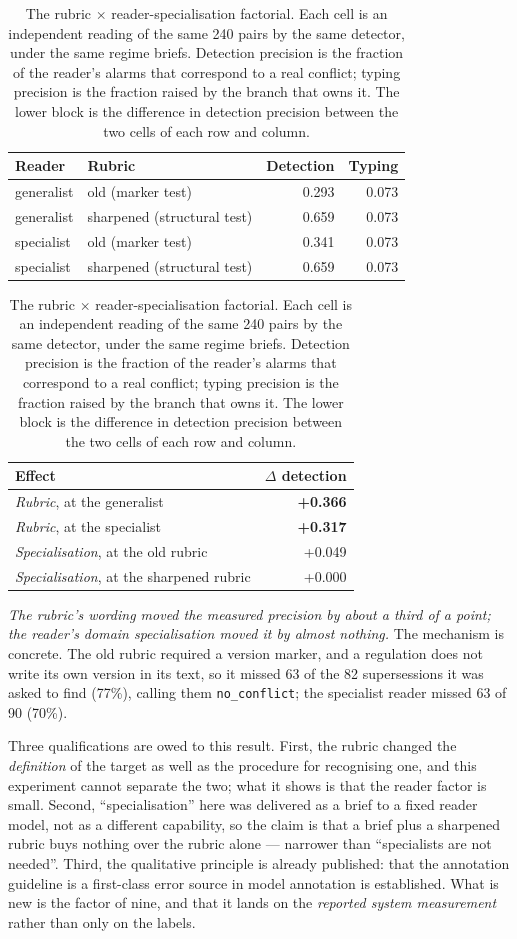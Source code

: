 \documentclass[preprint,3p,times]{elsarticle}
\begin{document}
\begin{table}[t]
\centering
\caption{The rubric $\times$ reader-specialisation factorial. Each cell is an independent reading of the same 240 pairs by the same detector, under the same regime briefs. Detection precision is the fraction of the reader's alarms that correspond to a real conflict; typing precision is the fraction raised by the branch that owns it. The lower block is the difference in detection precision between the two cells of each row and column.}
\label{tab:ind-factorial}
\small
\begin{tabular}{llrr}
\toprule
Reader & Rubric & Detection & Typing \\
\midrule
generalist & old (marker test) & 0.293 & 0.073 \\
generalist & sharpened (structural test) & 0.659 & 0.073 \\
specialist & old (marker test) & 0.341 & 0.073 \\
specialist & sharpened (structural test) & 0.659 & 0.073 \\
\bottomrule
\end{tabular}
\vspace{3pt}
\begin{tabular}{lr}
\toprule
Effect & $\Delta$ detection \\
\midrule
\emph{Rubric}, at the generalist & \textbf{+0.366} \\
\emph{Rubric}, at the specialist & \textbf{+0.317} \\
\emph{Specialisation}, at the old rubric & +0.049 \\
\emph{Specialisation}, at the sharpened rubric & +0.000 \\
\bottomrule
\end{tabular}
\end{table}


\emph{The rubric's wording moved the measured precision by about a third of
a point; the reader's domain specialisation moved it by almost nothing.}
The mechanism is concrete. The old rubric required a version marker, and a
regulation does not write its own version in its text, so it missed
63 of the
82 supersessions it was asked to find
(77\%),
calling them \texttt{no\_conflict}; the specialist reader missed
63 of
90
(70\%).

Three qualifications are owed to this result. First, the rubric changed the
\emph{definition} of the target as well as the procedure for recognising
one, and this experiment cannot separate the two; what it shows is that the
reader factor is small. Second, ``specialisation'' here was delivered as a
brief to a fixed reader model, not as a different capability, so the claim is
that a brief plus a sharpened rubric buys nothing over the rubric alone ---
narrower than ``specialists are not needed''. Third, the qualitative
principle is already published: that the annotation guideline is a
first-class error source in model annotation is established. What is new is
the factor of nine, and that it lands on the \emph{reported system
measurement} rather than only on the labels.
\end{document}
